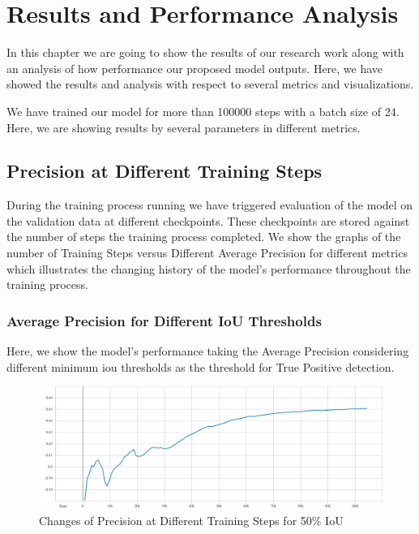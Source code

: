 \chapter{Results and Performance Analysis}
    In this chapter we are going to show the results of our research work along with an analysis of how performance our proposed model outputs. Here, we have showed the results and analysis with respect to several metrics and visualizations.
    
    We have trained our model for more than 100000 steps with a batch size of 24. Here, we are showing results by several parameters in different metrics.
    
    \section{Precision at Different Training Steps}
        During the training process running we have triggered evaluation of the model on the validation data at different checkpoints. These checkpoints are stored against the number of steps the training process completed.
        We show the graphs of the number of Training Steps versus Different Average Precision for different metrics which illustrates the changing history of the model's performance throughout the training process.
        
        \subsection{Average Precision for Different IoU Thresholds}
            Here, we show the model's performance taking the Average Precision considering different minimum \acrfull{iou} thresholds as the threshold for True Positive detection.
            
            
            \begin{figure}
                \centering
                \includegraphics[width=\textwidth]{images/mAP-50-IoU.pdf}
                \caption{Changes of Precision at Different Training Steps for 50\% IoU}
                \label{fig:precision_iou50}
            \end{figure}
            
